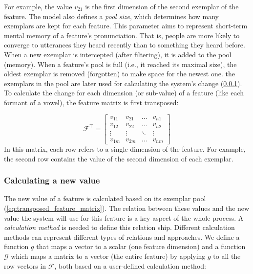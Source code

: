 \noindent
For example, the value $v_{21}$ is the first dimension of the second exemplar of the feature.
The model also defines a \textit{pool size}, which determines how many exemplars are kept for each feature.
This parameter aims to represent short-term mental memory of a feature's pronunciation.
That is, people are more likely to converge to utterances they heard recently than to something they heard before.
When a new exemplar is intercepted (after filtering), it is added to the pool (memory).
When a feature's pool is full (i.e., it reached its maximal size), the oldest exemplar is removed (forgotten) to make space for the newest one.
the exemplars in the pool are later used for calculating the system's change (\cref{subsubsec:calculating_changed_value}).
To calculate the change for each dimension (or sub-value) of a feature (like each formant of a vowel), the feature matrix is first transposed:

\begin{equation}
\label{eq:transposed_feature_matrix}
\textbf{$\mathcal{F}$}^\top =
\begin{bmatrix} 
v_{11} & v_{21} & \dots  & v_{n1}\\
v_{12} & v_{22} & \dots  & v_{n2} \\
\vdots & \vdots & \ddots & \vdots \\
v_{1m} & v_{2m} & \dots  & v_{nm} 
\end{bmatrix}
\end{equation}
\noindent
In this matrix, each row refers to a single dimension of the feature.
For example, the second row contains the value of the second dimension of each exemplar.

\subsubsection{Calculating a new value}
\label{subsubsec:calculating_changed_value}

The new value of a feature is calculated based on its exemplar pool (\cref{eq:transposed_feature_matrix}).
The relation between these values and the new value the system will use for this feature is a key aspect of the whole process.
A \textit{calculation method} is needed to define this relation ship.
Different calculation methods can represent different types of relations and approaches.
We define a function $g$ that maps a vector to a scalar (one feature dimension) and a function $\mathcal{G}$ which maps a matrix to a vector (the entire feature) by applying $g$ to all the row vectors in $\mathcal{F}$, both based on a user-defined calculation method:

